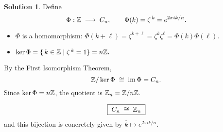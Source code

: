 \documentclass[12pt]{article}
\theoremstyle{definition} %
\newtheorem{solution}{Solution}
\theoremstyle{plain} %
\begin{document}
\begin{solution}
              Define
              \[
                 \Phi:\Bbb Z\;\longrightarrow\;C_{n},
                 \qquad
                 \Phi(k)=\zeta^{\,k}=e^{2\pi i k/n}.
              \]
              \begin{itemize}
                 \item $\Phi$ is a homomorphism:
                       \(
                         \Phi(k+\ell)=\zeta^{k+\ell}=\zeta^{k}\zeta^{\ell}
                                    =\Phi(k)\Phi(\ell).
                       \)
                 \item $\ker\Phi=\{\,k\in\Bbb Z\mid\zeta^{\,k}=1\}
                                  =n\Bbb Z.
                       $
              \end{itemize}
              By the First Isomorphism Theorem,
              \[
                 \Bbb Z/\ker\Phi
                    \;\cong\;
                 \operatorname{im}\Phi
                    =C_{n}.
              \]
              Since $\ker\Phi=n\Bbb Z$, the quotient is
              \(
                 \Bbb Z_{n}=\Bbb Z/n\Bbb Z.
              \)
              
              \[
                 \boxed{\;
                   C_{n}\;\cong\;\Bbb Z_{n}
                 \;}
              \]
              and this bijection is concretely given by
              \(
                 \overline{k}\longmapsto e^{2\pi i k/n}.
              \)
              
              \end{solution}
\end{document}

